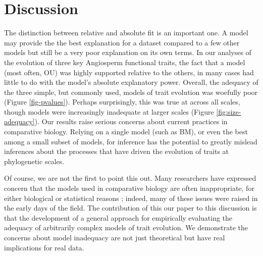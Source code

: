 \documentclass[a4paper,12pt]{article}
\begin{document}
\section{Discussion}

The distinction between relative and absolute fit is an important one. A model may provide the the best explanation for a dataset compared to a few other models but still be a very poor explanation on its own terms. In our analyses of the evolution of three key Angiosperm functional traits, the fact that a model (most often, OU) was highly supported relative to the others, in many cases had little to do with the model's absolute explanatory power. Overall, the adequacy of the three simple, but commonly used, models of trait evolution was woefully poor (Figure \ref{fig-pvalues}). Perhaps surprisingly, this was true at across all scales, though models were increasingly inadequate at larger scales (Figure \ref{fig:size-adequacy}). Our results raise serious concerns about current practices in comparative biology. Relying on a single model (such as BM), or even the best among a small subset of models, for inference has the potential to greatly mislead inferences about the processes that have driven the evolution of traits at phylogenetic scales.

Of course, we are not the first to point this out. Many researchers have expressed concern that the models used in comparative biology are often inappropriate, for either biological or statistical reasons \citep{Felsenstein1985, Felsenstein1988, HarveyPagel1991, Garland1992, Pagel1993, Diaz1996, HansenMartins1996, Price1997, Garland1999, GarlandIves2000, HansenOrzack2005, Hansen2012, Felsenstein2012, Boettiger2012, SlaterPennell}; indeed, many of these issues were raised in the early days of the field. The contribution of this our paper to this discussion is that the development of a general approach for empirically evaluating the adequacy of arbitrarily complex models of trait evolution. We demonstrate the concerns about model inadequacy are not just theoretical but have real implications for real data.
\end{document}
